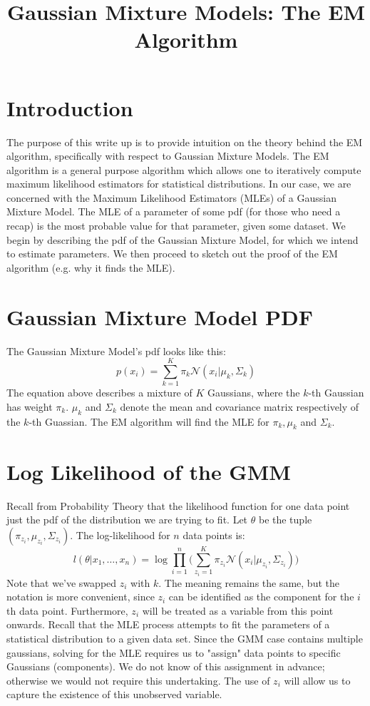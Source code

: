 \documentclass{article}
\title{Gaussian Mixture Models: The EM Algorithm}
\begin{document}
\maketitle

\section{Introduction}
The purpose of this write up is to provide intuition on the theory behind the EM algorithm, specifically with respect to Gaussian Mixture Models. The EM algorithm is a general purpose algorithm which allows one to iteratively compute maximum likelihood estimators for statistical distributions. In our case, we are concerned with the Maximum Likelihood Estimators (MLEs) of a Gaussian Mixture Model. The MLE of a parameter of some pdf (for those who need a recap) is the most probable value for that parameter, given some dataset. We begin by describing the pdf of the Gaussian Mixture Model, for which we intend to estimate parameters. We then proceed to sketch out the proof of the EM algorithm (e.g. why it finds the MLE).

\section{Gaussian Mixture Model PDF}
The Gaussian Mixture Model's pdf looks like this:
\begin{equation}
	p(x_{i}) = \sum\limits_{k = 1}^{K} \pi_{k} \mathcal{N}(x_{i} | \mu_{k}, \Sigma_{k})
\end{equation}
The equation above describes a mixture of $K$ Gaussians, where the $k$-th Gaussian has weight $\pi_{k}$. $\mu_{k}$ and $\Sigma_{k}$ denote the mean and covariance matrix respectively of the $k$-th Guassian. The EM algorithm will find the MLE for $\pi_{k}, \mu_{k}$ and $\Sigma_{k}$.

\section{Log Likelihood of the GMM}
Recall from Probability Theory that the likelihood function for one data point just the pdf of the distribution we are trying to fit. Let $\theta$ be the tuple $(\pi_{z_{i}}, \mu_{z_{i}}, \Sigma_{z_{i}})$. The log-likelihood for $n$ data points is:
\begin{equation}
	l(\theta | x_{1}, \ldots, x_{n}) = \log \prod_{i = 1}^{n} \Bigg(\sum\limits_{z_{i} = 1}^{K} \pi_{z_{i}} \mathcal{N}(x_{i} | \mu_{z_{i}}, \Sigma_{z_{i}}) \Bigg)
\end{equation}
Note that we've swapped $z_{i}$ with $k$. The meaning remains the same, but the notation is more convenient, since $z_{i}$ can be identified as the component for the $i$th data point. Furthermore, $z_{i}$ will be treated as a variable from this point onwards. Recall that the MLE process attempts to fit the parameters of a statistical distribution to a given data set. Since the GMM case contains multiple gaussians, solving for the MLE requires us to "assign" data points to specific Gaussians (components). We do not know of this assignment in advance; otherwise we would not require this undertaking. The use of $z_{i}$ will allow us to capture the existence of this unobserved variable.
\end{document}

